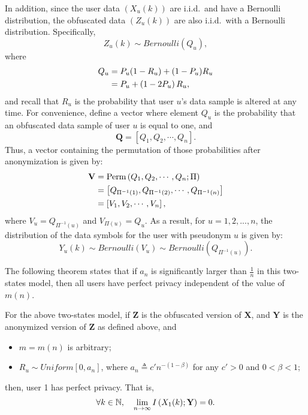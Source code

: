 In addition, since the user data $\left(X_u(k)\right)$ are i.i.d.\ and have a Bernoulli distribution, the obfuscated data $\left(Z_u(k)\right)$ are also i.i.d.\ with  a Bernoulli distribution. Specifically,
\[Z_u(k) \sim Bernoulli\left(Q_u\right),\]
where
\begin{align}
\nonumber {Q}_u &=P_u(1-R_u)+(1-P_u)R_u  \\
\nonumber &= P_u+\left(1-2P_u\right)R_u,\ \
\end{align}
and recall that $R_u$ is the probability that user $u$'s data sample is altered at any time. For convenience, define a vector where element $Q_u$ is the probability that an obfuscated data sample of user $u$ is equal to one, and
\[\textbf{Q} =\left[{Q}_{1},{Q}_{2}, \cdots,{Q}_{n}\right].\]
Thus, a vector containing the permutation of those probabilities after anonymization is given by:
\begin{align}
\nonumber \textbf{V} &=\textrm{Perm}\left({Q}_{1}, {Q}_{2}, \cdots,  {Q}_{n}; \Pi \right) \\
\nonumber &=\left[ {Q}_{\Pi^{-1}(1)}, {Q}_{\Pi^{-1}(2)}, \cdots, {Q}_{\Pi^{-1}(n)}\right ] \\
\nonumber &=\left[{V}_{1}, {V}_{2}, \cdots, {V}_{n}\right ] ,\ \
\end{align}
where ${V}_{u} = {Q}_{\Pi^{-1}(u)}$ and  ${V}_{\Pi(u)} = {Q}_{u}$. As a result, for $u=1,2,..., n$, the distribution of the data symbols for the user with pseudonym $u$ is given by:
\[ Y_u(k) \sim Bernoulli \left(V_u\right) \sim Bernoulli\left(Q_{\Pi^{-1}(u)}\right)  .\]

The following theorem states that if $a_n$ is significantly larger than $\frac{1}{n}$ in this two-states model, then all users have perfect privacy independent of the value of $m(n)$.
\begin{thm}\label{two_state_thm}
 For the above two-states model, if $\textbf{Z}$ is the obfuscated version of $\textbf{X}$, and $\textbf{Y}$ is the anonymized version of $\textbf{Z}$  as defined above, and
\begin{itemize}
	\item $m=m(n)$ is arbitrary;
	\item $R_u \sim Uniform [0, a_n]$, where $a_n \triangleq c'n^{-\left(1-\beta\right)}$ for any $c'>0$ and $0<\beta<1$;
\end{itemize}
then, user 1 has perfect privacy. That is,
\begin{align}%
\no  \forall k\in \mathbb{N}, \ \ \ \lim\limits_{n\rightarrow \infty} I \left(X_1(k);{\textbf{Y}}\right) =0.
\end{align}
\end{thm}


